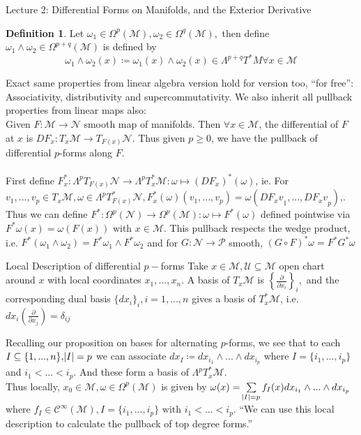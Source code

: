 \documentclass[10pt]{article}
\theoremstyle{plain}
\theoremstyle{definition}
\newtheorem{defn}[thm]{Definition} %
\newcommand{\with}{\text{ with }}
\newcommand{\man}{\mathcal{M}}
\newcommand{\nan}{\mathcal{N}}
\newcommand{\chartU}{\mathcal{U}}
\newcommand{\setform}[2]{\Lambda^{#1} {#2}}
\newcommand{\allthevs}[2]{v_{#1},...,v_{#2}}
\newcommand{\allthe}[3]{{#1}_{#2},...,{#1}_{#3}}
\newcommand{\wedgge}{\omega_1\wedge\omega_2}
\newcommand{\tang}{T_x\man}
\newcommand{\dualtang}{T_x^*\man}
\newcommand{\difftang}{\setform{p}{\dualtang}}
\newcommand{\pdifftangbundle}[1]{\setform{#1}{T^*M}}
\newcommand{\pformman}[1]{\Omega^{#1}(\man)}
\newcommand{\iparderiv}[1]{\frac{\partial}{\partial x_{#1}}}
\newcommand{\dx}{dx}
\begin{document}
\begin{section}{Lecture 2: Differential Forms on Manifolds, and the Exterior Derivative}
\begin{defn}
Let $\omega_1\in \pformman{p},\omega_2 \in \pformman{q},$ then define $\wedgge\in \pformman{p+q}$ is defined by 
$$\wedgge(x) \coloneqq \omega_1(x) \wedge \omega_2(x) \in \pdifftangbundle{p+q}\forall x\in\man$$
\end{defn}
Exact same properties from linear algebra version hold for version too, ``for free'': Associativity, distributivity and supercommutativity. We also inherit all pullback properties from linear maps also:\\
Given $F:\man \to \nan$ smooth map of manifolds. Then $\forall x \in \man$,  the differential of $F$ at $x$ is 
$DF_x : \tang \to T_{F(x)}{\nan} $. Thus given $p\geq 0$, we have the pullback of differential $p$-forms along $F$.\\\\
\noindent
First define $F^*_x : \setform{p}{T_{F(x)}\nan} \to \difftang : \omega \mapsto (DF_x)^*(\omega)$, ie. For $\allthevs{1}{p} \in \tang, \omega \in \setform{p}{T^*_{F(x)}\nan}, F^*_x(\omega)\left( \allthevs{1}{p} \right) = \omega(\allthe{DF_x v}{1}{p})$,.
Thus we can define $F^* : \Omega^p(\nan) \to \pformman{p} : \omega \mapsto F^*(\omega)$ defined pointwise via $F^*\omega(x) = \omega(F(x)) \with x \in \man$. This pullback respects the wedge product, i.e. $F^*(\wedgge) = F^*\omega_1 \wedge F^*\omega_2$ and for $G:\nan \to \mathcal{P}$ smooth, $(G\circ F)^* \omega = F^* G^* \omega$
\begin{subsection}{Local Description of differential $p-$forms}
Take $x\in\man, \chartU \subseteq\man$ open chart around $x$ with local coordinates $\allthe{x}{1}{n}$. A basis of $\tang$ is $\left\{\iparderiv{i} \right\}_i,$ and the corresponding dual basis $\{\dx_i\}_i, i =1,...,n $ gives a basis of $\dualtang$, i.e. $\dx_i(\iparderiv{j}) = \delta_{ij}$

Recalling our proposition on bases for alternating $p$-forms, we see that to each $I \subseteq \{1,...,n\}, \abs{I} = p$ we can associate $\dx_I \coloneqq \dx_{i_1}\wedge...\wedge\dx_{i_p}$ where $I = \{ \allthe{i}{1}{p}\}$ and $i_1<...<i_p.$ And these form a basis of $\difftang$. \\
Thus locally, $x_0 \in \man, \omega \in \pformman{p}$ is given by $\omega(x) = \sum\limits_{\abs{I} = p} f_I(x) \dx_{i_1}\wedge ... \wedge \dx_{i_p}$ where $f_I \in \mathcal{C}^{\infty}(\man), I = \{ \allthe{i}{1}{p}\} \with i_1<...<i_p.$ ``We can use this local description to calculate the pullback of top degree forms.''
\end{subsection}


\end{section}
\end{document}
